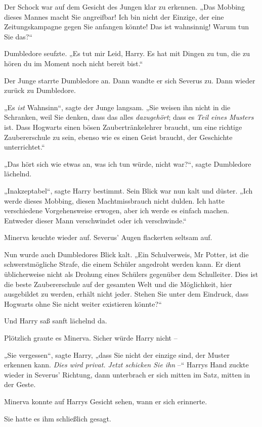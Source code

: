 {Der Schock war auf dem Gesicht des Jungen klar zu erkennen. „Das Mobbing dieses Mannes macht Sie angreifbar! Ich bin nicht der Einzige, der eine Zeitungskampagne gegen Sie anfangen könnte! Das ist wahnsinnig! Warum tun Sie das?“

Dumbledore seufzte. „Es tut mir Leid, Harry. Es hat mit Dingen zu tun, die zu hören du im Moment noch nicht bereit bist.“

Der Junge starrte Dumbledore an. Dann wandte er sich Severus zu. Dann wieder zurück zu Dumbledore.

„Es \emph{ist} Wahnsinn“, sagte der Junge langsam. „Sie weisen ihn nicht in die Schranken, weil Sie denken, dass das alles \emph{dazugehört}; dass es \emph{Teil eines Musters} ist. Dass Hogwarts einen bösen Zaubertränkelehrer braucht, um eine richtige Zaubererschule zu sein, ebenso wie es einen Geist braucht, der Geschichte unterrichtet.“

„Das hört sich wie etwas an, was ich tun würde, nicht war?“, sagte Dumbledore lächelnd.

„Inakzeptabel“, sagte Harry bestimmt. Sein Blick war nun kalt und düster. „Ich werde dieses Mobbing, diesen Machtmissbrauch nicht dulden. Ich hatte verschiedene Vorgehensweise erwogen, aber ich werde es einfach machen. Entweder dieser Mann verschwindet oder ich verschwinde.“

Minerva keuchte wieder auf. Severus' Augen flackerten seltsam auf.

Nun wurde auch Dumbledores Blick kalt. „Ein Schulverweis, Mr Potter, ist die schwerstmögliche Strafe, die einem Schüler angedroht werden kann. Er dient üblicherweise nicht als Drohung eines Schülers gegenüber dem Schulleiter. Dies ist die beste Zaubererschule auf der gesamten Welt und die Möglichkeit, hier ausgebildet zu werden, erhält nicht jeder. Stehen Sie unter dem Eindruck, dass Hogwarts ohne Sie nicht weiter existieren könnte?“

Und Harry saß sanft lächelnd da.

Plötzlich graute es Minerva. Sicher würde Harry nicht --

„Sie vergessen“, sagte Harry, „dass Sie nicht der einzige sind, der Muster erkennen kann. \emph{Dies wird privat. Jetzt schicken Sie ihn} --“ Harrys Hand zuckte wieder in Severus' Richtung, dann unterbrach er sich mitten im Satz, mitten in der Geste.

Minerva konnte auf Harrys Gesicht sehen, wann er sich erinnerte.

Sie hatte es ihm schließlich gesagt.

}
